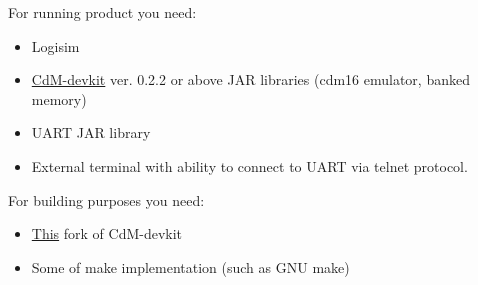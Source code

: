 For running product you need:

\begin{itemize}
	\item Logisim
	\item \href{https://github.com/cdm-processors/cdm-devkit}{CdM-devkit} ver. 0.2.2 or above JAR libraries (cdm16 emulator, banked memory)
	\item UART JAR library
	\item External terminal with ability to connect to UART via telnet protocol.
\end{itemize}

For building purposes you need:

\begin{itemize}
	\item \href{https://github.com/Proletcultist/cdm-devkit-macro-improvements}{This} fork of CdM-devkit
	\item Some of make implementation (such as GNU make)
\end{itemize}
